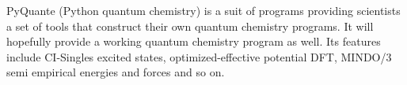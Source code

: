 PyQuante (Python quantum chemistry) is a suit of programs providing scientists a set of tools that construct their own quantum chemistry programs. It will hopefully provide a working quantum chemistry program as well. Its features include CI-Singles excited states, optimized-effective potential DFT, MINDO/3 semi empirical energies and forces and so on.